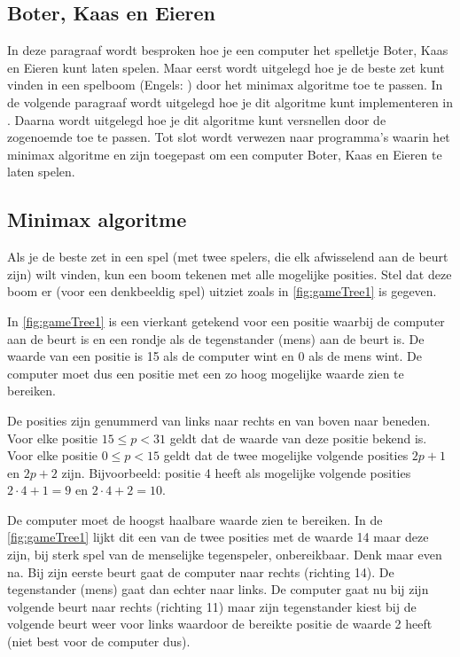 \begin{cpplstShortInline}
\section{Boter, Kaas en Eieren}
\label{sec:BoterKaasEnEieren}
In deze paragraaf wordt besproken hoe je een computer het spelletje Boter, Kaas en Eieren kunt laten spelen.
Maar eerst wordt uitgelegd hoe je de beste zet kunt vinden in een spelboom (Engels: ) door het minimax algoritme toe te passen.
In de volgende paragraaf wordt uitgelegd hoe je dit algoritme kunt implementeren in \Cpp{}.
Daarna wordt uitgelegd hoe je dit algoritme kunt versnellen door de zogenoemde  toe te passen.
Tot slot wordt verwezen naar programma's waarin het minimax algoritme en  zijn toegepast om een computer Boter, Kaas en Eieren te laten spelen.
\subsection{Minimax algoritme}
\label{sec:MiniMaxAlgoritme}
Als je de beste zet in een spel (met twee spelers, die elk afwisselend aan de beurt zijn) wilt vinden, kun een boom tekenen met alle mogelijke posities.
Stel dat deze boom er (voor een denkbeeldig spel) uitziet zoals in \cref{fig:gameTree1} is gegeven.


In \cref{fig:gameTree1} is een vierkant getekend voor een positie waarbij de computer aan de beurt is en een rondje als de tegenstander (mens) aan de beurt is.
De waarde van een positie is 15 als de computer wint en 0 als de mens wint.
De computer moet dus een positie met een zo hoog mogelijke waarde zien te bereiken.

De posities zijn genummerd van links naar rechts en van boven naar beneden.
Voor elke positie $15 \le p < 31$ geldt dat de waarde van deze positie bekend is.
Voor elke positie $0 \le p < 15$ geldt dat de twee mogelijke volgende posities $2p + 1$ en $2p + 2$ zijn.
Bijvoorbeeld: positie 4 heeft als mogelijke volgende posities $2 \cdot 4 + 1 = 9$ en $2 \cdot 4 + 2 = 10$.

De computer moet de hoogst haalbare waarde zien te bereiken.
In de \cref{fig:gameTree1} lijkt dit een van de twee posities met de waarde 14 maar deze zijn, bij sterk spel van de menselijke tegenspeler, onbereikbaar.
Denk maar even na.
Bij zijn eerste beurt gaat de computer naar rechts (richting 14).
De tegenstander (mens) gaat dan echter naar links.
De computer gaat nu bij zijn volgende beurt naar rechts (richting 11) maar zijn tegenstander kiest bij de volgende beurt weer voor links waardoor de bereikte positie de waarde 2 heeft (niet best voor de computer dus).


\end{cpplstShortInline}
